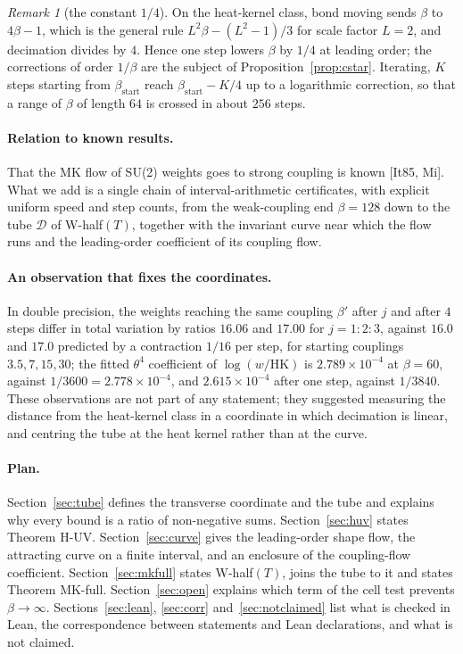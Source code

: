 \documentclass[11pt,a4paper]{article}
\theoremstyle{definition}
\theoremstyle{remark}
\newtheorem{remark}[theorem]{Remark}
\newcommand{\HK}{\mathrm{HK}}
\newcommand{\cD}{\mathcal{D}}
\begin{document}
\begin{remark}[the constant $1/4$]
On the heat-kernel class, bond moving sends $\beta$ to $4\beta-1$, which is the general rule $L^2\beta-(L^2-1)/3$ for scale factor $L=2$, and decimation divides by $4$.
Hence one step lowers $\beta$ by $1/4$ at leading order; the corrections of order $1/\beta$ are the subject of Proposition~\ref{prop:cstar}.
Iterating, $K$ steps starting from $\beta_{\mathrm{start}}$ reach $\beta_{\mathrm{start}}-K/4$ up to a logarithmic correction, so that a range of $\beta$ of length $64$ is crossed in about $256$ steps.
\end{remark}

\paragraph{Relation to known results.}
That the MK flow of SU(2) weights goes to strong coupling is known [It85, Mi].
What we add is a single chain of interval-arithmetic certificates, with explicit uniform speed and step counts, from the weak-coupling end $\beta=128$ down to the tube $\cD$ of W-half$(T)$, together with the invariant curve near which the flow runs and the leading-order coefficient of its coupling flow.

\paragraph{An observation that fixes the coordinates.}
In double precision, the weights reaching the same coupling $\beta'$ after $j$ and after $4$ steps differ in total variation by ratios $16.06$ and $17.00$ for $j=1{:}2{:}3$, against $16.0$ and $17.0$ predicted by a contraction $1/16$ per step, for starting couplings $3.5,7,15,30$; the fitted $\theta^4$ coefficient of $\log(w/\HK)$ is $2.789\times10^{-4}$ at $\beta=60$, against $1/3600=2.778\times10^{-4}$, and $2.615\times10^{-4}$ after one step, against $1/3840$.
These observations are not part of any statement; they suggested measuring the distance from the heat-kernel class in a coordinate in which decimation is linear, and centring the tube at the heat kernel rather than at the curve.

\paragraph{Plan.}
Section~\ref{sec:tube} defines the transverse coordinate and the tube and explains why every bound is a ratio of non-negative sums.
Section~\ref{sec:huv} states Theorem H-UV.
Section~\ref{sec:curve} gives the leading-order shape flow, the attracting curve on a finite interval, and an enclosure of the coupling-flow coefficient.
Section~\ref{sec:mkfull} states W-half$(T)$, joins the tube to it and states Theorem MK-full.
Section~\ref{sec:open} explains which term of the cell test prevents $\beta\to\infty$.
Sections~\ref{sec:lean}, \ref{sec:corr} and~\ref{sec:notclaimed} list what is checked in Lean, the correspondence between statements and Lean declarations, and what is not claimed.
\end{document}
